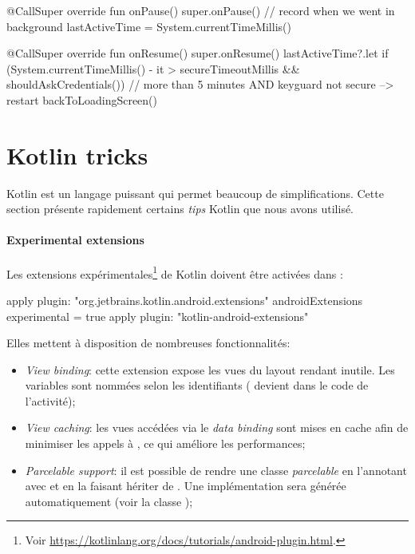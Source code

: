 \begin{kotlincode}
@CallSuper
override fun onPause() {
    super.onPause()
    // record when we went in background
    lastActiveTime = System.currentTimeMillis()
}

@CallSuper
override fun onResume() {
    super.onResume()
    lastActiveTime?.let {
        if (System.currentTimeMillis() - it > secureTimeoutMillis && 
                shouldAskCredentials()){
            // more than 5 minutes AND keyguard not secure --> restart
            backToLoadingScreen()
        }
    }  
}
\end{kotlincode}

\section{Kotlin tricks}

Kotlin est un langage puissant qui permet beaucoup de simplifications. Cette section présente rapidement certains \emph{tips} Kotlin que nous avons utilisé.

\paragraph*{Experimental extensions} Les extensions expérimentales\footnote{Voir \url{https://kotlinlang.org/docs/tutorials/android-plugin.html}.} de Kotlin doivent être activées dans :

\begin{javacode}
apply plugin: "org.jetbrains.kotlin.android.extensions"
androidExtensions {
    experimental = true
} 
apply plugin: "kotlin-android-extensions"
\end{javacode}

Elles mettent à disposition de nombreuses fonctionnalités:
\begin{itemize}
    \item \emph{View binding}: cette extension expose les vues du layout rendant  inutile. Les variables sont nommées selon les identifiants ( devient  dans le code de l'activité); 
    \item \emph{View caching}: les vues accédées via le \emph{data binding} sont mises en cache afin de minimiser les appels à , ce qui améliore les performances;
    \item \emph{Parcelable support}: il est possible de rendre une classe \emph{parcelable} en l'annotant avec  et en la faisant hériter de . Une implémentation sera générée automatiquement (voir la classe ); 
\end{itemize}

